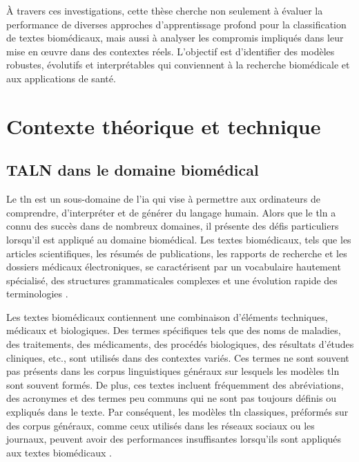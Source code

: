 \documentclass[12pt]{report}
\begin{document}
À travers ces investigations, cette thèse cherche non seulement à évaluer la performance de diverses approches d’apprentissage profond pour la classification de textes biomédicaux, mais aussi à analyser les compromis impliqués dans leur mise en œuvre dans des contextes réels. L’objectif est d’identifier des modèles robustes, évolutifs et interprétables qui conviennent à la recherche biomédicale et aux applications de santé.

\vspace{0.5cm}

\newpage

\chapter{Contexte théorique et technique}

\section{TALN dans le domaine biomédical}

Le \gls{tln} est un sous-domaine de l'\gls{ia} qui vise à permettre aux ordinateurs de comprendre, d’interpréter et de générer du langage humain. Alors que le \gls{tln} a connu des succès dans de nombreux domaines, il présente des défis particuliers lorsqu'il est appliqué au domaine biomédical. Les textes biomédicaux, tels que les articles scientifiques, les résumés de publications, les rapports de recherche et les dossiers médicaux électroniques, se caractérisent par un vocabulaire hautement spécialisé, des structures grammaticales complexes et une évolution rapide des terminologies \cite{devlin2019bert}.

Les textes biomédicaux contiennent une combinaison d'éléments techniques, médicaux et biologiques. Des termes spécifiques tels que des noms de maladies, des traitements, des médicaments, des procédés biologiques, des résultats d'études cliniques, etc., sont utilisés dans des contextes variés. Ces termes ne sont souvent pas présents dans les corpus linguistiques généraux sur lesquels les modèles \gls{tln} sont souvent formés. De plus, ces textes incluent fréquemment des abréviations, des acronymes et des termes peu communs qui ne sont pas toujours définis ou expliqués dans le texte. Par conséquent, les modèles \gls{tln} classiques, préformés sur des corpus généraux, comme ceux utilisés dans les réseaux sociaux ou les journaux, peuvent avoir des performances insuffisantes lorsqu’ils sont appliqués aux textes biomédicaux \cite{lee2020biobert}.
\end{document}
